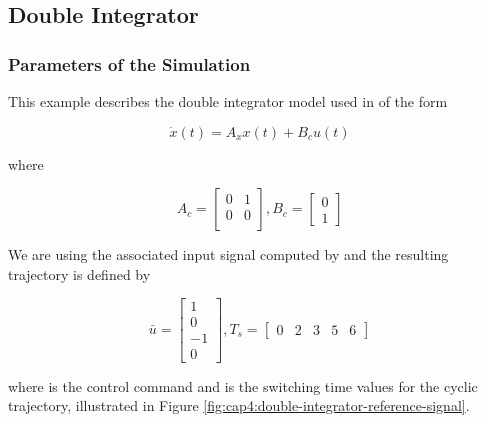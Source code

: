 \subsection{Double Integrator}
\label{sec:cap4:double-integrator}


\subsubsection{Parameters of the Simulation}

This example describes the double integrator model used in  of the form

\begin{equation}
    \dot{x}(t) = A_x x(t) + B_c u(t)
\end{equation}

\noindent
where

\begin{equation}
    \label{eq:cap4:double-integrator-dynamics}
    A_c = \left[
        \begin{matrix}
            0 & 1 \\
            0 & 0 \\
        \end{matrix}
    \right],
    B_c = \left[
        \begin{matrix}
            0 \\
            1
        \end{matrix}
    \right]
\end{equation}

We are using the associated input signal computed by  and 
the resulting trajectory is defined by

\begin{equation}
    \label{eq:cap4:double-integrator-reference-signal}
    \bar{u} = \left[
        \begin{matrix}
            1 \\
            0 \\
            -1 \\
            0
        \end{matrix}
    \right],
    T_s = \left[
        \begin{matrix}
            0 &
            2 &
            3 &
            5 &
            6
        \end{matrix}
    \right]
\end{equation}

\noindent
where  is the control command and  is the switching time values for the cyclic trajectory,
illustrated in Figure \ref{fig:cap4:double-integrator-reference-signal}.

